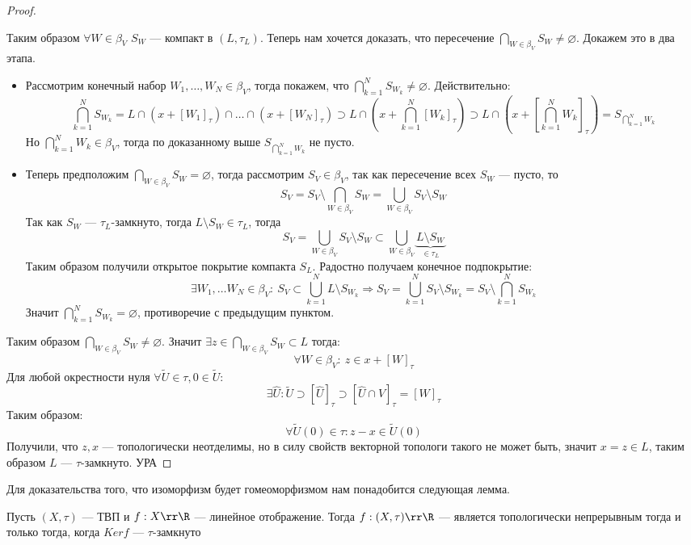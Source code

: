 \begin{proof}
\begin{itemize}
	\end{itemize}
	Таким образом $\forall W \in \beta_V$ $S_W$ --- компакт в $(L, \tau_L)$. Теперь нам хочется доказать, что пересечение $\bigcap_{W \in \beta_V}S_W \neq \varnothing$. Докажем это в два этапа.
	\begin{itemize}
		\item Рассмотрим конечный набор $W_1, \dots, W_N \in \beta_V$, тогда покажем, что $\bigcap_{k=1}^N S_{W_k} \neq \varnothing$. Действительно:
		$$
		\bigcap_{k=1}^N S_{W_k} = L \cap (x + [W_1]_\tau)\cap \dots \cap (x + [W_N]_\tau) \supset L \cap \left( x + \bigcap_{k=1}^N [W_k]_\tau\right) \supset L \cap \left(x + \left[\bigcap_{k=1}^N W_k\right]_\tau\right) = S_{\bigcap_{k=1}^N W_k}
		$$
		Но $\bigcap_{k=1}^N W_k \in \beta_V$, тогда по доказанному выше $S_{\bigcap_{k=1}^N W_k}$ не пусто.
		\item Теперь предположим $\bigcap_{W \in \beta_V}S_W = \varnothing$, тогда рассмотрим $S_V \in \beta_V$, так как пересечение всех $S_W$ --- пусто, то 
		$$
		S_V = S_V \setminus \bigcap_{W \in \beta_V}S_W  = \bigcup_{W \in \beta_V} S_V \setminus S_W 
		$$
		Так как $S_W$ --- $\tau_L$-замкнуто, тогда $L \setminus S_W \in \tau_L$, тогда 
		$$
		S_V = \bigcup_{W \in \beta_V} S_V \setminus S_W \subset \bigcup_{W \in \beta_V}\underbrace{L \setminus S_W}_{\in \tau_L} 
		$$
		Таким образом получили открытое покрытие компакта $S_L$. Радостно получаем конечное подпокрытие:
		$$
		\exists W_1, \dots W_N \in \beta_V: \ S_V \subset \bigcup_{k=1}^N L \setminus S_{W_k} \Rightarrow S_V = \bigcup_{k=1}^N S_V \setminus S_{W_k}  = S_V \setminus \bigcap_{k=1}^N S_{W_k}
		$$
		Значит $\bigcap_{k=1}^N S_{W_k} = \varnothing$, противоречие с предыдущим пунктом.
	\end{itemize}  
Таким образом $\bigcap_{W \in \beta_V}S_W \neq \varnothing$. Значит $\exists z \in \bigcap_{W \in \beta_V}S_W  \subset L$ тогда:
$$
\forall W \in \beta_V: \ z \in x + [W]_\tau 
$$
Для любой окрестности нуля $\forall \tilde{U} \in \tau, 0 \in \tilde{U}$:
$$
\exists \hat{U}: \tilde{U} \supset 	[\hat{U}]_\tau  \supset [\hat{U}\cap V]_\tau = [W]_\tau
$$
Таким образом: 
$$
\forall \tilde{U}(0) \in \tau: z - x \in \tilde{U}(0) 
$$
Получили, что $z,x$ --- топологически неотделимы, но в силу свойств векторной топологи такого не может быть, значит $x = z \in L$, таким образом $L$ --- $\tau$-замкнуто. УРА
\end{proof}
Для доказательства того, что изоморфизм будет гомеоморфизмом нам понадобится следующая лемма.
\begin{lemma}
	Пусть $(X, \tau)$ --- ТВП и $f: X \rr \R$ --- линейное отображение. Тогда $f: (X, \tau) \rr \R$ --- является топологически непрерывным тогда и только тогда, когда $Ker f $ --- $\tau$-замкнуто
\end{lemma}
